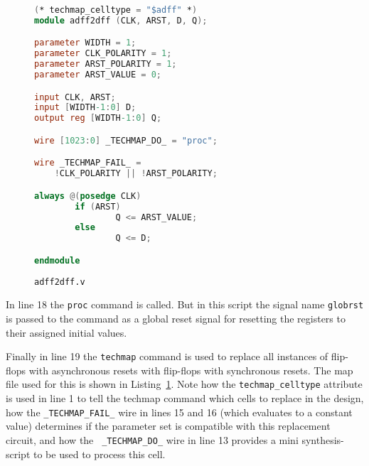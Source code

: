 \documentclass[9pt,technote,a4paper]{IEEEtran}
\begin{document}
\begin{figure}[b!]
\begin{lstlisting}[language=Verilog]
(* techmap_celltype = "$adff" *)
module adff2dff (CLK, ARST, D, Q);

parameter WIDTH = 1;
parameter CLK_POLARITY = 1;
parameter ARST_POLARITY = 1;
parameter ARST_VALUE = 0;

input CLK, ARST;
input [WIDTH-1:0] D;
output reg [WIDTH-1:0] Q;

wire [1023:0] _TECHMAP_DO_ = "proc";

wire _TECHMAP_FAIL_ =
    !CLK_POLARITY || !ARST_POLARITY;

always @(posedge CLK)
        if (ARST)
                Q <= ARST_VALUE;
        else
                Q <= D;

endmodule
\end{lstlisting}
\renewcommand{\figurename}{Listing}
\caption{\tt adff2dff.v}
\label{adff2dff.v}
\end{figure}

In line 18 the {\tt proc} command is called. But in this script the signal name
{\tt globrst} is passed to the command as a global reset signal for resetting
the registers to their assigned initial values.

Finally in line 19 the {\tt techmap} command is used to replace all instances
of flip-flops with asynchronous resets with flip-flops with synchronous resets.
The map file used for this is shown in Listing~\ref{adff2dff.v}. Note how the
{\tt techmap\_celltype} attribute is used in line 1 to tell the techmap command
which cells to replace in the design, how the {\tt \_TECHMAP\_FAIL\_} wire in
lines 15 and 16 (which evaluates to a constant value) determines if the
parameter set is compatible with this replacement circuit, and how the {\tt
\_TECHMAP\_DO\_} wire in line 13 provides a mini synthesis-script to be used to
process this cell.
\end{document}
